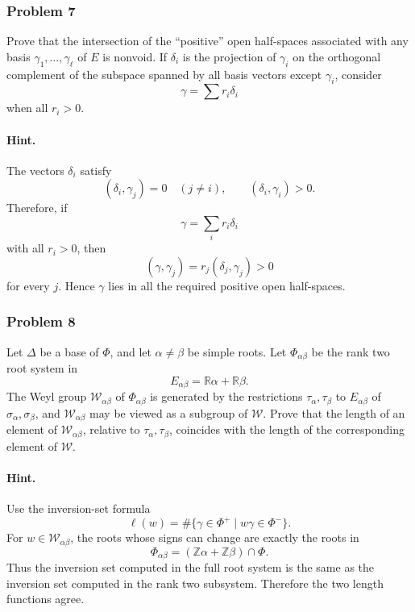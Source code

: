 \documentclass[12pt, a4paper]{article}
\begin{document}
\subsubsection{Problem 7}

Prove that the intersection of the ``positive'' open half-spaces associated
with any basis \(\gamma_1,\ldots,\gamma_\ell\) of \(E\) is nonvoid. If
\(\delta_i\) is the projection of \(\gamma_i\) on the orthogonal complement of
the subspace spanned by all basis vectors except \(\gamma_i\), consider
\[
\gamma=\sum r_i\delta_i
\]
when all \(r_i>0\).

\paragraph{Hint.}
The vectors \(\delta_i\) satisfy
\[
(\delta_i,\gamma_j)=0\quad(j\neq i),
\qquad
(\delta_i,\gamma_i)>0.
\]
Therefore, if
\[
\gamma=\sum_i r_i\delta_i
\]
with all \(r_i>0\), then
\[
(\gamma,\gamma_j)=r_j(\delta_j,\gamma_j)>0
\]
for every \(j\). Hence \(\gamma\) lies in all the required positive open
half-spaces.

\subsubsection{Problem 8}

Let \(\Delta\) be a base of \(\Phi\), and let \(\alpha\neq\beta\) be simple
roots. Let \(\Phi_{\alpha\beta}\) be the rank two root system in
\[
E_{\alpha\beta}=\mathbb R\alpha+\mathbb R\beta.
\]
The Weyl group \(\mathcal W_{\alpha\beta}\) of \(\Phi_{\alpha\beta}\) is
generated by the restrictions \(\tau_\alpha,\tau_\beta\) to \(E_{\alpha\beta}\)
of \(\sigma_\alpha,\sigma_\beta\), and \(\mathcal W_{\alpha\beta}\) may be
viewed as a subgroup of \(\mathcal W\). Prove that the length of an element of
\(\mathcal W_{\alpha\beta}\), relative to \(\tau_\alpha,\tau_\beta\), coincides
with the length of the corresponding element of \(\mathcal W\).

\paragraph{Hint.}
Use the inversion-set formula
\[
\ell(w)=\#\{\gamma\in\Phi^+\mid w\gamma\in\Phi^-\}.
\]
For \(w\in\mathcal W_{\alpha\beta}\), the roots whose signs can change are
exactly the roots in
\[
\Phi_{\alpha\beta}=(\mathbb Z\alpha+\mathbb Z\beta)\cap\Phi.
\]
Thus the inversion set computed in the full root system is the same as the
inversion set computed in the rank two subsystem. Therefore the two length
functions agree.
\end{document}

